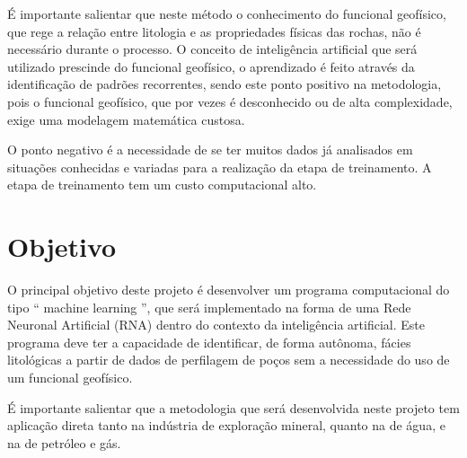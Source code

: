 É importante salientar que neste método o conhecimento do funcional geofísico, que rege a relação entre litologia e as propriedades físicas das rochas, não é necessário durante o processo. O conceito de inteligência artificial que será utilizado prescinde do funcional geofísico, o aprendizado é feito através da identificação de padrões recorrentes, sendo este ponto positivo na metodologia, pois o funcional geofísico, que por vezes é desconhecido ou de alta complexidade, exige uma modelagem matemática custosa.

O ponto negativo é a necessidade de se ter muitos dados já analisados em situações conhecidas e variadas para a realização da etapa de treinamento. A etapa de treinamento tem um custo computacional alto.




\section{Objetivo}
O principal objetivo deste projeto é desenvolver um programa computacional do tipo “ machine learning ”, que será implementado na forma de uma Rede Neuronal Artificial (RNA) dentro do contexto da inteligência artificial. Este programa deve ter a capacidade de identificar, de forma autônoma, fácies litológicas a partir de dados de perfilagem de poços sem a necessidade do uso de um funcional geofísico.

É importante salientar que a metodologia que será desenvolvida neste projeto tem aplicação direta tanto na indústria de exploração mineral, quanto na de água, e na de petróleo e gás.

